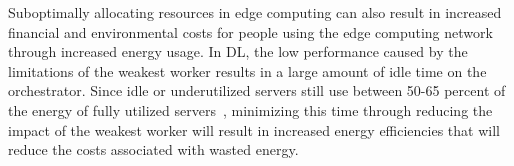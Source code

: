 \documentclass[../mthe-493-final-project.tex]{subfiles}
\begin{document}
    Suboptimally allocating resources in edge computing can also result in increased financial and environmental costs for people using the edge computing network through increased energy usage. In DL, the low performance caused by the limitations of the weakest worker results in a large amount of idle time on the orchestrator. Since idle or underutilized servers still use between 50-65 percent of the energy of fully utilized servers~\cite{noauthor_triple_nodate}, minimizing this time through reducing the impact of the weakest worker will result in increased energy efficiencies that will reduce the costs associated with wasted energy.
\end{document}
